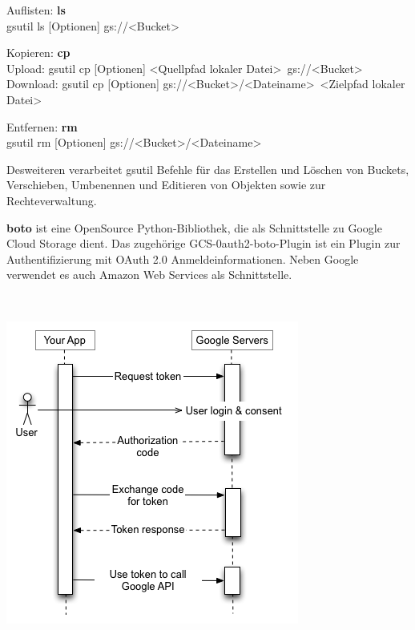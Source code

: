 \documentclass[12pt,a4paper,bibliography=totocnumbered,listof=totocnumbered]{scrartcl}
\begin{document}
\begin{compactitem}
	\item Auflisten: \textbf{ls}\\
	gsutil ls [Optionen] gs://\textless Bucket\textgreater
	\item Kopieren: \textbf{cp}\\
	Upload: gsutil cp [Optionen] \textless Quellpfad lokaler Datei\textgreater~gs://\textless Bucket\textgreater\\
	Download:  gsutil cp [Optionen] gs://\textless Bucket\textgreater/\textless Dateiname\textgreater~\textless Zielpfad lokaler Datei\textgreater
	\item Entfernen: \textbf{rm}\\
	gsutil rm [Optionen] gs://\textless Bucket\textgreater /\textless Dateiname\textgreater
\end{compactitem}

Desweiteren verarbeitet gsutil Befehle für das Erstellen und Löschen von Buckets, Verschieben, Umbenennen und Editieren von Objekten sowie zur Rechteverwaltung.

\textbf{boto} \cite{47} ist eine OpenSource Python-Bibliothek, die als Schnittstelle zu Google Cloud Storage dient. Das zugehörige GCS-0auth2-boto-Plugin ist ein Plugin zur Authentifizierung mit OAuth 2.0 Anmeldeinformationen. Neben Google verwendet es auch Amazon Web Services als Schnittstelle.

\vspace{1em}
$\;$\\
\begin{minipage}{\linewidth}
	\centering
	\includegraphics[width=0.7\linewidth]{./img/OAuth.png}
	\label{OAuthV}
\end{minipage}
\vspace{1em}
\end{document}
